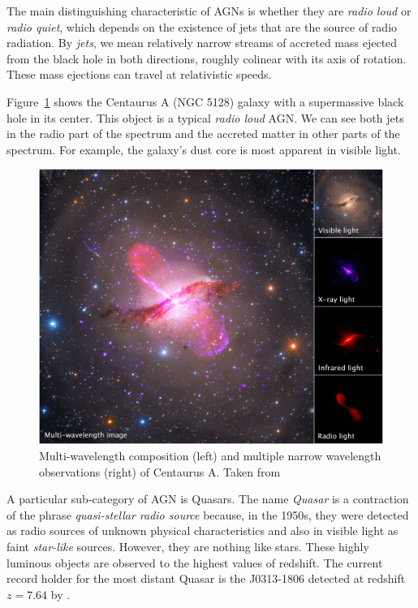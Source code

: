     The main distinguishing characteristic of AGNs is whether they are \emph{radio loud} or \emph{radio quiet}, which depends on the existence of jets that are the source of radio radiation. By \emph{jets}, we mean relatively narrow streams of accreted mass ejected from the black hole in both directions, roughly colinear with its axis of rotation. These mass ejections can travel at relativistic speeds. 
    
    Figure~\ref{fig:centaurus_a_multiwave} shows the Centaurus A (NGC 5128) galaxy with a supermassive black hole in its center. This object is a typical \emph{radio loud} AGN. We can see both jets in the radio part of the spectrum and the accreted matter in other parts of the spectrum. For example, the galaxy's dust core is most apparent in visible light.

    \begin{figure}[t!]
        \centering
        \includegraphics[width=\columnwidth]{img/multiwave_centaurus_a_agn.png}
        \caption{Multi-wavelength composition (left) and multiple narrow wavelength observations (right) of Centaurus A. Taken from \citep{nasa_img_centaurus_a}}
        \label{fig:centaurus_a_multiwave}
    \end{figure}

    A particular sub-category of AGN is Quasars. The name \emph{Quasar} is a contraction of the phrase \emph{quasi-stellar radio source} because, in the 1950s, they were detected as radio sources of unknown physical characteristics and also in visible light as faint \emph{star-like} sources. However, they are nothing like stars. These highly luminous objects are observed to the highest values of redshift. The current record holder for the most distant Quasar is the J0313-1806 detected at redshift $z = 7.64$ by \citep{wang2021}. 

